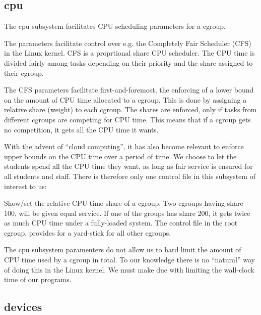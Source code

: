 \subsection{cpu}

The cpu subsystem facilitates CPU scheduling parameters for a cgroup.

The parameters facilitate control over e.g. the Completely Fair Scheduler (CFS)
in the Linux kernel\cite{sched-design-cfs.txt}. CFS is a proprtional share CPU
scheduler. The CPU time is divided fairly among tasks depending on their
priority and the share assigned to their cgroup.

The CFS parameters facilitate first-and-foremost, the enforcing of a lower
bound on the amount of CPU time allocated to a cgroup. This is done by
assigning a relative share (weight) to each cgroup. The shares are enforced,
only if tasks from different cgroups are competing for CPU time. This means
that if a cgroup gets no competition, it gets all the CPU time it wants.

With the advent of ``cloud computing'', it has also become relevant to enforce
upper bounds on the CPU time over a period of time\cite{turner-et-al-2010}. We
choose to let the students spend all the CPU time they want, as long as fair
service is ensured for all students and staff. There is therefore only one
control file in this subsystem of interest to us:

\begin{description}[\setleftmargin{0.2in}\breaklabel\setlabelstyle{\tt}]

\item[cpu.shares] Show/set the relative CPU time share of a cgroup. Two cgroups
having share 100, will be given equal service. If one of the groups has share
200, it gets twice as much CPU time under a fully-loaded system. The control
file in the root cgroup, provides for a yard-stick for all other cgroups.

\end{description}

The cpu subsystem paramenters do not allow us to hard limit the amount of CPU
time used by a cgroup in total. To our knowledge there is no ``natural'' way of
doing this in the Linux kernel. We must make due with limiting the wall-clock
time of our programs.

\subsection{devices}

